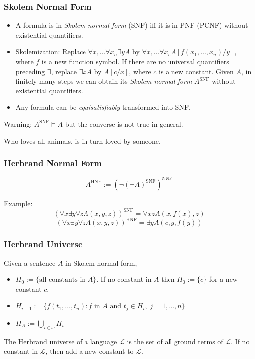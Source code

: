 \documentclass[UTF8,aspectratio=43,11pt,colorlinks,compress,openany]{beamer}%
\begin{document}
\begin{frame}\frametitle{Skolem Normal Form}
	\begin{itemize}
		\item A formula is in \emph{Skolem normal form} (SNF) iff it is in PNF (PCNF) without existential quantifiers. 
		\item Skolemization: Replace $\forall x_1\dots\forall x_n\exists y A$ by $\forall x_1\dots\forall x_n A[f(x_1,\dots,x_n)/y]$, where $f$ is a new function symbol. If there are no universal quantifiers preceding $\exists$, replace $\exists x A$ by $A[c/x]$, where $c$ is a new constant. Given $A$, in finitely many steps we can obtain its \emph{Skolem normal form} $A^{\mathrm{SNF}}$ without existential quantifiers.
		\item Any formula can be \emph{equisatisfiably} transformed into SNF.
	\end{itemize}
	Warning: $A^{\mathrm{SNF}}\vDash A$ but the converse is not true in general.
	\begin{exercise}
	Who loves all animals, is in turn loved by someone.
	\end{exercise}
\end{frame}

\begin{frame}\frametitle{Herbrand Normal Form}
	\begin{center}
		\[A^{\mathrm{HNF}}:=\left(\neg(\neg A)^{\mathrm{SNF}}\right)^{\mathrm{NNF}}\]
	\end{center}
	Example:
	\[(\forall x\exists y\forall z A(x,y,z))^{\mathrm{SNF}}=\forall xz A(x,f(x),z)\]
	\[(\forall x\exists y\forall z A(x,y,z))^{\mathrm{HNF}}=\exists y A(c,y,f(y))\]
\end{frame}

\begin{frame}\frametitle{Herbrand Universe}
\begin{definition}
Given a sentence $A$ in Skolem normal form,
\begin{itemize}
	\item $H_0:=\{\mbox{all constants in } A\}$. If no constant in $A$ then $H_0:=\{c\}$ for a new constant $c$.
	\item $H_{i+1}:=\big\{f(t_1,\dots,t_n): f \mbox{ in } A \mbox{ and } t_j\in H_i,\; j=1,\dots, n\big\}$
	\item $H_A:=\bigcup\limits_{i\in\omega}H_i$
\end{itemize}
\end{definition}
The Herbrand universe of a language $\mathscr{L}$ is the set of all ground terms of $\mathscr{L}$. If no constant in $\mathscr{L}$, then add a new constant to $\mathscr{L}$.
\end{frame}
\end{document}
